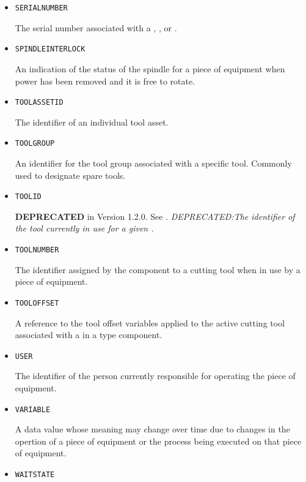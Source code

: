 \begin{itemize}
\item \texttt{SERIAL\textunderscore NUMBER}  

The serial number associated with a , , or .


\item \texttt{SPINDLE\textunderscore INTERLOCK}  

An indication of the status of the spindle for a piece of equipment when power has been removed and it is free to rotate.


\item \texttt{TOOL\textunderscore ASSET\textunderscore ID}  

The identifier of an individual tool asset.


\item \texttt{TOOL\textunderscore GROUP}  

An identifier for the tool group associated with a specific tool. Commonly used to designate spare tools.


\item \texttt{TOOL\textunderscore ID}  

\textbf{DEPRECATED} in Version 1.2.0.   See . \textit{DEPRECATED:The identifier of the tool currently in use for a given .}


\item \texttt{TOOL\textunderscore NUMBER}  

The identifier assigned by the  component to a cutting tool when in use by a piece of equipment.


\item \texttt{TOOL\textunderscore OFFSET}  

A reference to the tool offset variables applied to the active cutting tool associated with a  in a  type component.


\item \texttt{USER}  

The identifier of the person currently responsible for operating the piece of equipment.


\item \texttt{VARIABLE}  

A data value whose meaning may change over time due to changes in the opertion of a piece of equipment or the process being executed on that piece of equipment.


\item \texttt{WAIT\textunderscore STATE}  


\end{itemize}
